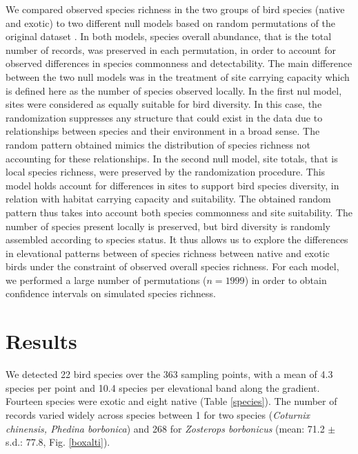\documentclass{article}
\begin{document}
We compared observed species richness in the two groups of bird species (native and exotic) to two different null models based on random permutations of the original dataset  \cite{Gotelli2000}. In both models, species overall abundance, that is the total number of records, was preserved in each permutation, in order to account for observed differences in species commonness and detectability. The main difference between the two null models was in the treatment of site carrying capacity which is defined here as the number of species observed locally. In the first nul model, sites were considered as equally suitable for bird diversity. In this  case, the randomization suppresses any structure that could exist in the data due to relationships between species and their environment in a broad sense. The random pattern obtained mimics the distribution of species richness not accounting for these relationships. In the second null model, site totals, that is local species richness, were preserved by the randomization procedure. This model holds account for differences in sites to support bird species diversity, in relation with habitat carrying capacity and suitability. The obtained random pattern thus takes into account both species commonness and site suitability. The number of species present locally is preserved, but bird diversity is randomly assembled according to species status. It thus allows us to explore the differences in elevational patterns between of species richness between native and exotic birds under the constraint of observed overall species richness. For each model, we performed a large number of permutations ($n=1999$) in order to obtain confidence intervals on simulated species richness. 



\section*{Results}

We detected 22 bird species over the 363 sampling points, with a mean of 4.3 species per point and 10.4 species per elevational band along the gradient.  Fourteen species were exotic and eight native (Table \ref{species}). The number of records varied widely across species between 1 for two species (\textit{Coturnix chinensis, Phedina borbonica}) and 268 for \textit{Zosterops borbonicus} (mean: 71.2 $\pm$ s.d.: 77.8, Fig. \ref{boxalti}). 
\end{document}
